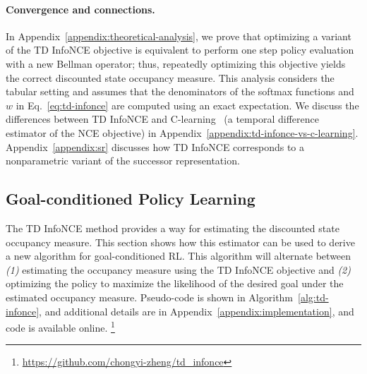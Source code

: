 \documentclass{article} %
\begin{document}
\paragraph{Convergence and connections.}
In Appendix~\ref{appendix:theoretical-analysis}, we prove that optimizing a variant of the TD InfoNCE objective is equivalent to perform one step policy evaluation with a new Bellman operator; thus, repeatedly optimizing this objective yields the correct discounted state occupancy measure. This analysis considers the tabular setting and assumes that the denominators of the softmax functions and $w$ in Eq.~\ref{eq:td-infonce} are computed using an exact expectation. We discuss the differences between TD InfoNCE and C-learning~\citep{eysenbach2020c} (a temporal difference estimator of the NCE objective) in Appendix~\ref{appendix:td-infonce-vs-c-learning}. Appendix~\ref{appendix:sr} discusses how TD InfoNCE corresponds to a nonparametric variant of the successor representation.

\subsection{Goal-conditioned Policy Learning}
\label{sec:alg}

The TD InfoNCE method provides a way for estimating the discounted state occupancy measure. This section shows how this estimator can be used to derive a new algorithm for goal-conditioned RL. This algorithm will alternate between \emph{(1)} estimating the occupancy measure using the TD InfoNCE objective and \emph{(2)} optimizing the policy to maximize the likelihood of the desired goal under the estimated occupancy measure. Pseudo-code is shown in Algorithm~\ref{alg:td-infonce}, and additional details are in Appendix~\ref{appendix:implementation}, and code is available online.%
\footnote{\url{https://github.com/chongyi-zheng/td_infonce}}
\end{document}

